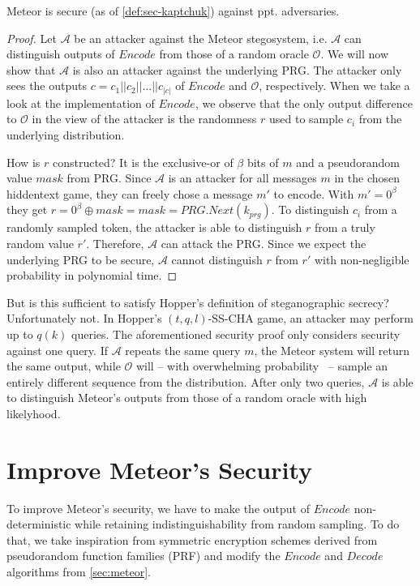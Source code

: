 \begin{theorem}
	Meteor is secure (as of \autoref{def:sec-kaptchuk}) against ppt. adversaries. 
\end{theorem}
\begin{proof}
	Let $\mathcal{A}$ be an attacker against the Meteor stegosystem, i.e. $\mathcal{A}$ can distinguish outputs of $Encode$ from those of a random oracle $\mathcal{O}$. 
	We will now show that $\mathcal{A}$ is also an attacker against the underlying PRG.
	The attacker only sees the outputs $c = c_1 ||c_2 || \dots || c_{|c|}$ of $Encode$ and $\mathcal{O}$, respectively. 
	When we take a look at the implementation of $Encode$, we observe that the only output difference to $\mathcal{O}$ in the view of the attacker is the randomness $r$ used to sample $c_i$ from the underlying distribution.
	
	How is $r$ constructed? 
	It is the exclusive-or of $\beta$ bits of $m$ and a pseudorandom value $mask$ from PRG.
	Since $\mathcal{A}$ is an attacker for all messages $m$ in the chosen hiddentext game, they can freely chose a message $m'$ to encode.
	With $m' = 0^\beta$ they get $r = 0^\beta \oplus mask = mask = PRG.Next(k_{prg})$.
	To distinguish $c_i$ from a randomly sampled token, the attacker is able to distinguish $r$ from a truly random value $r'$.
	Therefore, $\mathcal{A}$ can attack the PRG.
	Since we expect the underlying PRG to be secure, $\mathcal{A}$ cannot distinguish $r$ from $r'$ with non-negligible probability in polynomial time.
\end{proof}

But is this sufficient to satisfy Hopper's definition of steganographic secrecy?
Unfortunately not.
In Hopper's $(t,q,l)$-SS-CHA game, an attacker may perform up to $q(k)$ queries.
The aforementioned security proof only considers security against one query.
If $\mathcal{A}$ repeats the same query $m$, the Meteor system will return the same output, while $\mathcal{O}$ will -- with overwhelming probability~ -- sample an entirely different sequence from the distribution.
After only two queries, $\mathcal{A}$ is able to distinguish Meteor's outputs from those of a random oracle with high likelyhood.

\section{Improve Meteor's Security}

To improve Meteor's security, we have to make the output of $Encode$ non-deterministic while retaining indistinguishability from random sampling.
To do that, we take inspiration from symmetric encryption schemes derived from pseudorandom function families (PRF) and modify the $Encode$ and $Decode$ algorithms from \autoref{sec:meteor}. 

